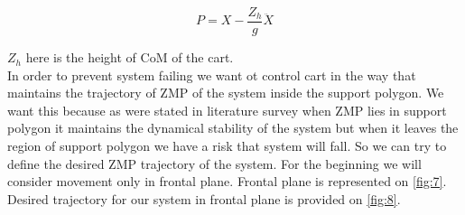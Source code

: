 \documentclass[12pt,a4paper]{report}
\begin{document}
		\begin{equation}
			P = X -\dfrac{Z_h}{g} \ddot{X}
		\end{equation}
		
		$Z_h$ here is the height of CoM of the cart.\\
		In order to prevent system failing we want ot control cart in the way that maintains the trajectory of ZMP of the system inside the support polygon. We want this because as were stated in literature survey when ZMP lies in support polygon it maintains the dynamical stability of the system but when it leaves the region of support polygon we have a risk that system will fall. So we can try to define the desired ZMP trajectory of the system. For the beginning we will consider movement only in frontal plane. Frontal plane is represented on \cref{fig:7}. Desired trajectory for our system in frontal plane is provided on \ref{fig:8}.
		
\end{document}
